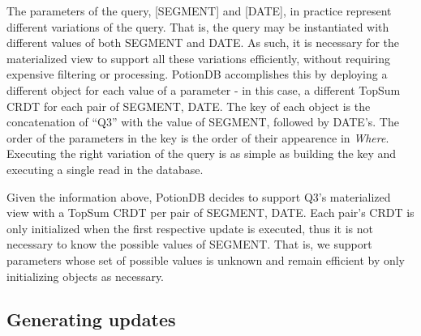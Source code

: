 \documentclass{vldb}
\begin{document}
The parameters of the query, [SEGMENT] and [DATE], in practice represent different variations of the query.
That is, the query may be instantiated with different values of both SEGMENT and DATE.
As such, it is necessary for the materialized view to support all these variations efficiently, without requiring expensive filtering or processing.
PotionDB accomplishes this by deploying a different object for each value of a parameter - in this case, a different TopSum CRDT for each pair of SEGMENT, DATE. 
The key of each object is the concatenation of “Q3” with the value of SEGMENT, followed by DATE’s. 
The order of the parameters in the key is the order of their appearence in \emph{Where}. 
Executing the right variation of the query is as simple as building the key and executing a single read in the database.
 
 
 Given the information above, PotionDB decides to support Q3’s materialized view with a TopSum CRDT per pair of SEGMENT, DATE.
 Each pair's CRDT is only initialized when the first respective update is executed, thus it is not necessary to know the possible values of SEGMENT.
 That is, we support parameters whose set of possible values is unknown and remain efficient by only initializing objects as necessary.
 
 \subsection{Generating updates}
 \label{subsec:generated_updates}
 
\end{document}
